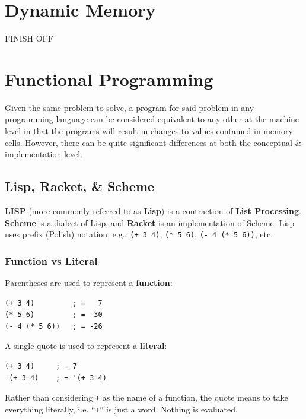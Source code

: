 \documentclass[a4paper,11pt]{article}
\begin{document}
\section{Dynamic Memory}
FINISH OFF

\section{Functional Programming}
Given the same problem to solve, a program for said problem in any programming language can be considered 
equivalent to any other at the machine level in that the programs will result in changes to values contained in 
memory cells. 
However, there can be quite significant differences at both the conceptual \& implementation level.

\subsection{Lisp, Racket, \& Scheme}
\textbf{LISP} (more commonly referred to as \textbf{Lisp}) is a contraction of \textbf{List Processing}.
\textbf{Scheme} is a dialect of Lisp, and \textbf{Racket} is an implementation of Scheme.
Lisp uses prefix  (Polish) notation, e.g.: \verb|(+ 3 4)|, \verb|(* 5 6)|, \verb|(- 4 (* 5 6))|, etc.

\subsubsection{Function vs Literal}
Parentheses are used to represent a \textbf{function}:
\begin{verbatim}
(+ 3 4)         ; =   7
(* 5 6)         ; =  30
(- 4 (* 5 6))   ; = -26
\end{verbatim}

A single quote is used to represent a \textbf{literal}:
\begin{verbatim}
(+ 3 4)     ; = 7
'(+ 3 4)    ; = '(+ 3 4)
\end{verbatim}

Rather than considering \verb|+| as the name of a function, the quote means to take everything literally, i.e. 
``\verb|+|'' is just a word.
Nothing is evaluated.
\end{document}
